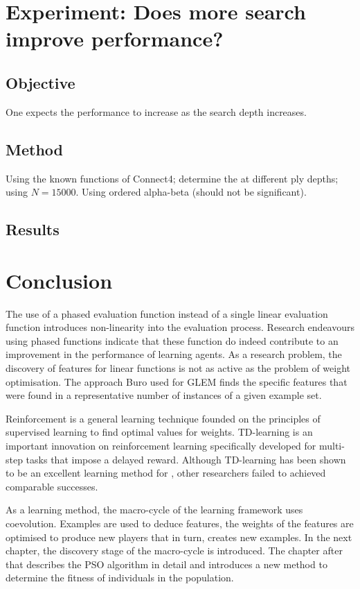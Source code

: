\section{Experiment: Does more search improve performance?}
\subsection*{Objective}
One expects the performance to increase as the search depth increases.
\subsection*{Method}
Using the known functions of Connect4; determine the  at different ply depths; using $N = 15000$.
Using ordered alpha-beta (should not be significant).
\subsection*{Results}
\section{Conclusion}
\label{sec:learning-conclusion}
The use of a phased evaluation function instead of a single linear evaluation function introduces non-linearity into the evaluation process. Research endeavours using phased functions indicate that these function do indeed contribute to an improvement in the  performance of learning agents.  As a research problem, the discovery of features for linear functions is not as active as the problem of weight optimisation.  The approach Buro used for GLEM finds the specific features that were found in a representative number of instances of a given example set.

Reinforcement is a general learning technique founded on the principles of supervised learning to find optimal values for weights.  TD-learning is an important innovation on reinforcement learning specifically developed for multi-step tasks that impose a delayed reward.  Although TD-learning has been shown to be an excellent learning method for , other researchers failed to achieved comparable successes. %

As a learning method, the macro-cycle of the learning framework uses coevolution.  Examples are used to deduce features, the weights of the features are optimised to produce new players that in turn, creates new examples.  In the next chapter, the discovery stage of the macro-cycle is introduced.  The chapter after that describes the PSO algorithm in detail and introduces a new method to determine the fitness of individuals in the population.   
